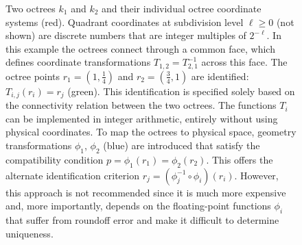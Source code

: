 \documentclass[letterpaper,11pt]{article}
\newcommand{\figlab}[1]{\label{fig:#1}}
\begin{document}
\begin{figure}[b!]
\begin{tikzpicture}
\end{tikzpicture}
\caption{%
Two octrees $k_1$ and $k_2$ and their individual octree coordinate systems
(red).  Quadrant coordinates at subdivision level $\ell \ge 0$ (not shown) are
discrete numbers that are integer multiples of $2^{-\ell}$.  In this example
the octrees connect through a common face, which defines coordinate
transformations $T_{1,2} = T_{2,1}^{-1}$ across this face.  The octree points
$r_1 = (1, \frac14)$ and $r_2 = (\frac34, 1)$ are identified: $T_{i,j}(r_i) =
r_j$ (green).  This identification is specified solely based on the
connectivity relation between the two octrees.  The functions $T_i$ can be
implemented in integer arithmetic, entirely without using physical coordinates.
To map the octrees to physical space, geometry transformations $\phi_1$,
$\phi_2$ (blue) are introduced that satisfy the compatibility condition $p =
\phi_1 (r_1) = \phi_2 (r_2)$.  This offers the alternate identification
criterion $r_j = (\phi_j ^{-1} \circ \phi_i) (r_i)$.  However, this approach is
not recommended since it is much more expensive and, more importantly, depends
on the floating-point functions $\phi_i$ that suffer from roundoff error and
make it difficult to determine uniqueness.
}
\figlab{octreemap}
\end{figure}
\end{document}

